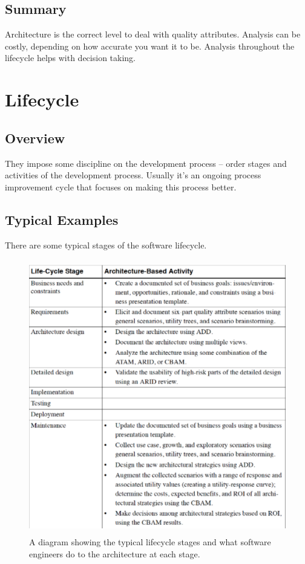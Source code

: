 \documentclass[a4paper]{report}
\begin{document}
\section{Summary}
Architecture is the correct level to deal with quality attributes.
Analysis can be costly, depending on how accurate you want it to be.
Analysis throughout the lifecycle helps with decision taking.

\chapter{Lifecycle}
\section{Overview}
They impose some discipline on the development process – order stages and activities of the development process. Usually it's an ongoing process improvement cycle that focuses on making this process better.

\section{Typical Examples}
There are some typical stages of the software lifecycle.
\begin{figure}[h]
\begin{center} 
    \includegraphics[scale=0.6,width = 15cm, height = 12cm]{images/LifecycleStages.pdf}
    \caption{A diagram showing the typical lifecycle stages and what software engineers do to the architecture at each stage.}
\end{center}
\end{figure}
\end{document}
